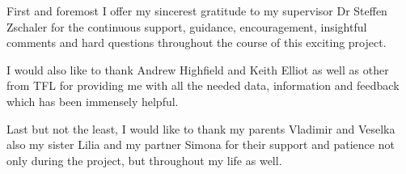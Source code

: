 First and foremost I offer my sincerest gratitude to my supervisor Dr Steffen Zschaler for the continuous support, guidance, encouragement, insightful comments and hard questions throughout the course of this exciting project.

I would also like to thank Andrew Highfield and Keith Elliot as well as other from TFL for providing me with all the needed data, information and feedback which has been immensely helpful.

Last but not the least, I would like to thank my parents Vladimir and Veselka also my sister Lilia and my partner Simona for their support and patience not only during the project, but throughout my life as well.